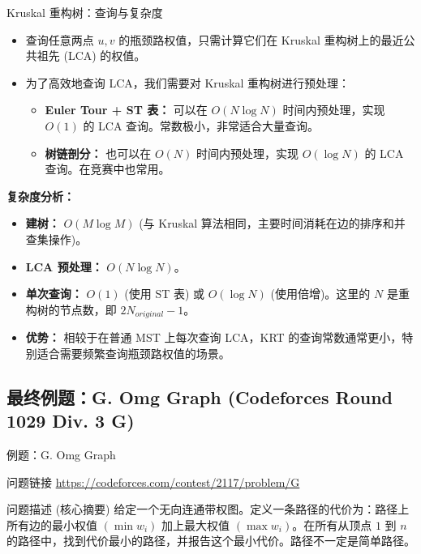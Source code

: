 \documentclass[11pt]{beamer}
\begin{document}
\begin{frame}{Kruskal 重构树：查询与复杂度}
    \begin{itemize}
        \item 查询任意两点 $u, v$ 的瓶颈路权值，只需计算它们在 Kruskal 重构树上的最近公共祖先 (LCA) 的权值。
        \item 为了高效地查询 LCA，我们需要对 Kruskal 重构树进行预处理：
        \begin{itemize}
            \item \textbf{Euler Tour + ST 表：} 可以在 $O(N \log N)$ 时间内预处理，实现 $O(1)$ 的 LCA 查询。常数极小，非常适合大量查询。
            \item \textbf{树链剖分：} 也可以在 $O(N)$ 时间内预处理，实现 $O(\log N)$ 的 LCA 查询。在竞赛中也常用。
        \end{itemize}
    \end{itemize}
\end{frame}


\begin{frame}
    \textbf{复杂度分析：}
        \begin{itemize}
            \item \textbf{建树：} $O(M \log M)$ (与 Kruskal 算法相同，主要时间消耗在边的排序和并查集操作)。
            \item \textbf{LCA 预处理：} $O(N \log N)$。
            \item \textbf{单次查询：} $O(1)$ (使用 ST 表) 或 $O(\log N)$ (使用倍增)。这里的 $N$ 是重构树的节点数，即 $2N_{original}-1$。
            \item \textbf{优势：} 相较于在普通 MST 上每次查询 LCA，KRT 的查询常数通常更小，特别适合需要频繁查询瓶颈路权值的场景。
        \end{itemize}
\end{frame}

\subsection{最终例题：G. Omg Graph (Codeforces Round 1029 Div. 3 G)}
\begin{frame}{例题：G. Omg Graph}
    \begin{block}{问题链接}
        \url{https://codeforces.com/contest/2117/problem/G}
    \end{block}
    \begin{block}{问题描述 (核心摘要)}
        给定一个无向连通带权图。定义一条路径的代价为：路径上所有边的最小权值 $(\min w_i)$ 加上最大权值 $(\max w_i)$。在所有从顶点 $1$ 到 $n$ 的路径中，找到代价最小的路径，并报告这个最小代价。路径不一定是简单路径。
    \end{block}
\end{frame}
\end{document}
